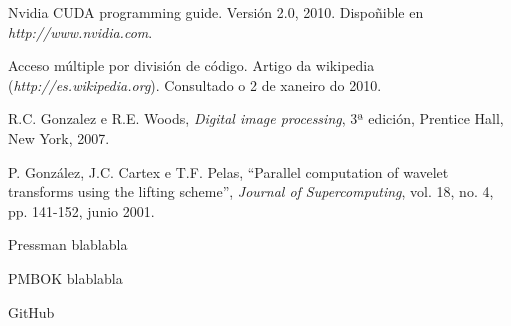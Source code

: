 

\begin{thebibliography}{99}
 Nvidia CUDA programming guide. Versión 2.0, 2010. Dispoñible en {\it http://www.nvidia.com}.

 Acceso múltiple por división de código. Artigo da wikipedia ({\it http://es.wikipedia.org}). Consultado o 2 de xaneiro do 2010.

 R.C. Gonzalez e R.E. Woods, {\it Digital image processing}, 3ª edición, Prentice Hall, New York, 2007.

 P. González, J.C. Cartex e T.F. Pelas, ``Parallel computation of wavelet transforms using the lifting scheme'', {\it Journal of Supercomputing}, vol. 18, no. 4, pp. 141-152, junio 2001.

 Pressman blablabla

 PMBOK blablabla

 GitHub  

\end{thebibliography}

